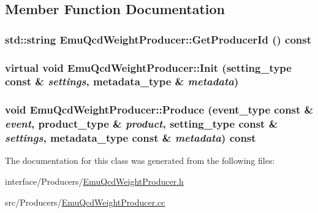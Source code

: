 \subsection{Member Function Documentation}
\hypertarget{classEmuQcdWeightProducer_af4587e953e530e649d0483531b3be3fe}{
\subsubsection[{GetProducerId}]{\setlength{\rightskip}{0pt plus 5cm}std::string EmuQcdWeightProducer::GetProducerId () const}}
\label{classEmuQcdWeightProducer_af4587e953e530e649d0483531b3be3fe}
\hypertarget{classEmuQcdWeightProducer_a60ca41c6c92ef55ba1b57ae71663bac6}{
\subsubsection[{Init}]{\setlength{\rightskip}{0pt plus 5cm}virtual void EmuQcdWeightProducer::Init (setting\_\-type const \& {\em settings}, \/  metadata\_\-type \& {\em metadata})}}
\label{classEmuQcdWeightProducer_a60ca41c6c92ef55ba1b57ae71663bac6}
\hypertarget{classEmuQcdWeightProducer_adb42a9ee5c3812e3b0e32632d8f244ef}{
\subsubsection[{Produce}]{\setlength{\rightskip}{0pt plus 5cm}void EmuQcdWeightProducer::Produce (event\_\-type const \& {\em event}, \/  product\_\-type \& {\em product}, \/  setting\_\-type const \& {\em settings}, \/  metadata\_\-type const \& {\em metadata}) const}}
\label{classEmuQcdWeightProducer_adb42a9ee5c3812e3b0e32632d8f244ef}


The documentation for this class was generated from the following files:\begin{DoxyCompactItemize}
\item 
interface/Producers/\hyperlink{EmuQcdWeightProducer_8h}{EmuQcdWeightProducer.h}\item 
src/Producers/\hyperlink{EmuQcdWeightProducer_8cc}{EmuQcdWeightProducer.cc}\end{DoxyCompactItemize}
